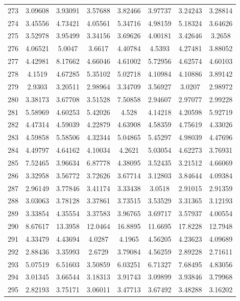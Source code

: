\begin{center}
\begin{longtable}{cccccccc}
273 & 3.09608 & 3.93091 & 3.57688 & 3.82466 & 3.97737 & 3.24243 & 3.28814\\
274 & 3.45556 & 4.73421 & 4.05561 & 5.34716 & 4.98159 & 5.18324 & 3.64626\\
275 & 3.52978 & 3.95499 & 3.34156 & 3.69626 & 4.00181 & 3.42646 & 3.2658\\
276 & 4.06521 & 5.0047 & 3.6617 & 4.40784 & 4.5393 & 4.27481 & 3.88052\\
277 & 4.42981 & 8.17662 & 4.66046 & 4.61002 & 5.72956 & 4.62574 & 4.60103\\
278 & 4.1519 & 4.67285 & 5.35102 & 5.02718 & 4.10984 & 4.10886 & 3.89142\\
279 & 2.9303 & 3.20511 & 2.98964 & 3.34709 & 3.56927 & 3.0207 & 2.98972\\
280 & 3.38173 & 3.67708 & 3.51528 & 7.50858 & 2.94607 & 2.97077 & 2.99228\\
281 & 5.58969 & 4.60253 & 5.42026 & 4.528 & 4.14218 & 4.20598 & 5.92719\\
282 & 4.47314 & 4.59039 & 4.22879 & 4.63908 & 4.58359 & 4.75619 & 4.33026\\
283 & 4.59858 & 5.58506 & 4.32344 & 5.04865 & 5.45297 & 4.98039 & 4.47696\\
284 & 4.49797 & 4.64162 & 4.10034 & 4.2621 & 5.03054 & 4.62273 & 3.76931\\
285 & 7.52465 & 3.96634 & 6.87778 & 4.38095 & 3.52435 & 3.21512 & 4.66069\\
286 & 3.32958 & 3.56772 & 3.72626 & 3.67714 & 3.12803 & 3.84644 & 4.09384\\
287 & 2.96149 & 3.77846 & 3.41174 & 3.33438 & 3.0518 & 2.91015 & 2.91359\\
288 & 3.03063 & 3.78128 & 3.37861 & 3.73515 & 3.53529 & 3.31365 & 3.12193\\
289 & 3.33854 & 4.35554 & 3.37583 & 3.96765 & 3.69717 & 3.57937 & 4.00554\\
290 & 8.67617 & 13.3958 & 12.0464 & 16.8895 & 11.6695 & 17.8228 & 12.7948\\
291 & 4.33479 & 4.43694 & 4.0287 & 4.1965 & 4.56205 & 4.23623 & 4.09689\\
292 & 2.88436 & 3.35993 & 2.6729 & 3.79084 & 4.56259 & 2.89228 & 2.71611\\
293 & 5.07519 & 6.51603 & 3.50859 & 6.03251 & 6.71327 & 7.68495 & 4.83056\\
294 & 3.01345 & 3.66544 & 3.18313 & 3.91743 & 3.09899 & 3.93846 & 3.79968\\
295 & 2.82193 & 3.75171 & 3.06011 & 3.47713 & 3.67492 & 3.48288 & 3.16202\\

\end{longtable}
\end{center}
